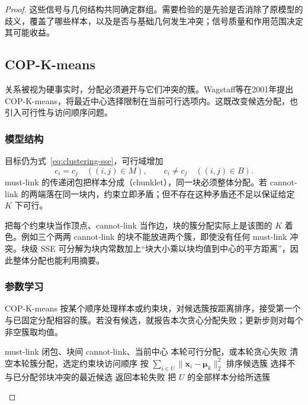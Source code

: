 \begin{proof}
这些信号与几何结构共同确定群组。需要检验的是先验是否消除了原模型的歧义，覆盖了哪些样本，以及是否与基础几何发生冲突；信号质量和作用范围决定其可能收益。

\subsection{COP-K-means}
\label{sec:clustering-cop}

关系被视为硬事实时，分配必须避开与它们冲突的簇。Wagstaff等在2001年提出COP-K-means，将最近中心选择限制在当前可行选项内。这既改变候选分配，也引入可行性与访问顺序问题。

\subsubsection{模型结构}

目标仍为式~\eqref{eq:clustering-sse}，可行域增加
\begin{equation}
 c_i=c_j\quad((i,j)\in M),\qquad
 c_i\ne c_j\quad((i,j)\in B).
 \label{eq:clustering-cop}
\end{equation}
must-link 的传递闭包把样本分成（chunklet），同一块必须整体分配。若 cannot-link 的两端落在同一块内，约束立即矛盾；但不存在这种矛盾还不足以保证给定 $K$ 下可行。

把每个约束块当作顶点、cannot-link 当作边，块的簇分配实际上是该图的 $K$ 着色。例如三个两两 cannot-link 的块不能放进两个簇，即使没有任何 must-link 冲突。块级 SSE 可分解为块内常数加上“块大小乘以块均值到中心的平方距离”，因此整体分配也能利用摘要。

\subsubsection{参数学习}

COP-K-means 按某个顺序处理样本或约束块，对候选簇按距离排序，接受第一个与已固定分配相容的簇。若没有候选，就报告本次贪心分配失败；更新步则对每个非空簇取均值。

\begin{algorithm}
 \label{alg:clustering-cop}
 \begin{algorithmic}[1]
 \Require must-link 闭包、块间 cannot-link、当前中心
 \Ensure 本轮可行分配，或本轮贪心失败
 \State 清空本轮簇分配，选定约束块访问顺序
  \State 按 $\sum_{i\in U}\lVert\bm{x}_i-\bm{\mu}_k\rVert_2^2$ 排序候选簇
  \State 选择不与已分配邻块冲突的最近候选
   \State 返回本轮失败
  \EndIf
  \State 把 $U$ 的全部样本分给所选簇
 \EndFor
 \end{algorithmic}
\end{algorithm}


\end{proof}
